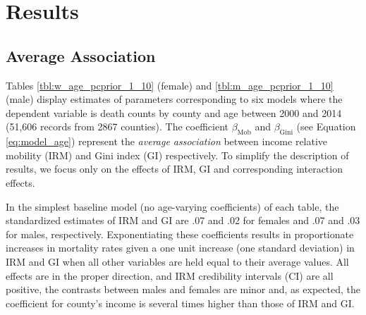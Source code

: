 \documentclass[11pt]{article}
\begin{document}




\section{Results}

\subsection{Average Association}

Tables \ref{tbl:w_age_pcprior_1_10} (female) and \ref{tbl:m_age_pcprior_1_10} (male) display estimates of parameters corresponding to six models where the dependent variable is death counts by county and age between 2000 and 2014 (51,606 records from 2867 counties). The coefficient $\beta_{\text{Mob}}$ and $\beta_{\text{Gini}}$ (see Equation \ref{eq:model_age}) represent the \textit{average association} between income relative mobility (IRM)  and Gini index (GI) respectively. To simplify the description of results, we focus only on the effects of IRM, GI and corresponding interaction effects. 

In the simplest baseline model (no age-varying coefficients) of each table, the standardized estimates of IRM and GI are .07 and .02 for females and .07 and .03 for males, respectively. Exponentiating these coefficients results in proportionate increases in mortality rates given a one unit increase (one standard deviation) in IRM and GI when all other variables are held equal to their average values. All effects are in the proper direction, and IRM credibility intervals (CI) are all positive, the contrasts between males and females are minor and, as expected, the coefficient for county's income is several times higher than those of IRM and GI. 
\end{document}
